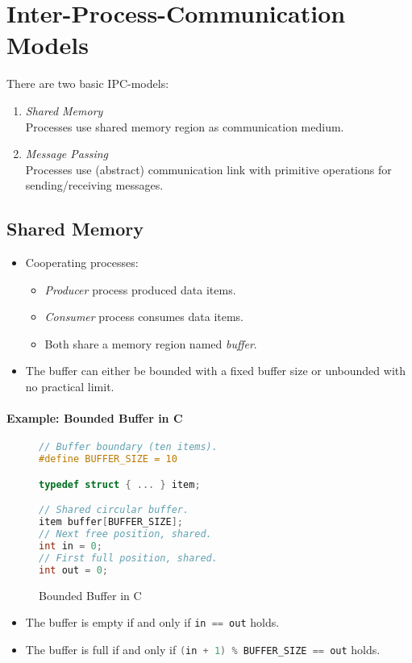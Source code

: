 \documentclass[a4paper, 11pt, accentcolor = tud3b]{tudreport}
\begin{document}
        \section{Inter-Process-Communication Models}
            There are two basic IPC-models:
            \begin{enumerate}
            	\item \textit{Shared Memory} \\ Processes use shared memory region as communication medium.
            	\item \textit{Message Passing} \\ Processes use (abstract) communication link with primitive operations for sending/receiving messages.
            \end{enumerate}

            \subsection{Shared Memory}
                \begin{itemize}
                	\item Cooperating processes:
	                	\begin{itemize}
	                		\item \textit{Producer} process produced data items.
	                		\item \textit{Consumer} process consumes data items.
	                		\item Both share a memory region named \textit{buffer}.
	                	\end{itemize}
                	\item The buffer can either be bounded with a fixed buffer size or unbounded with no practical limit.
                \end{itemize}
            
	            \paragraph{Example: Bounded Buffer in C}
		            \begin{figure}[H]
		            	\centering
		            	\begin{lstlisting}[language = C]
// Buffer boundary (ten items).
#define BUFFER_SIZE = 10

typedef struct { ... } item;

// Shared circular buffer.
item buffer[BUFFER_SIZE];
// Next free position, shared.
int in = 0;
// First full position, shared.
int out = 0;
\end{lstlisting}
		            	\caption{Bounded Buffer in C}
		            \end{figure}
		            \begin{itemize}
		            	\item The buffer is empty if and only if \lstinline[language = C]|in == out| holds.
		            	\item The buffer is full if and only if \lstinline[language = C]|(in + 1) % BUFFER_SIZE == out| holds.
		            \end{itemize}
	            
\end{document}
